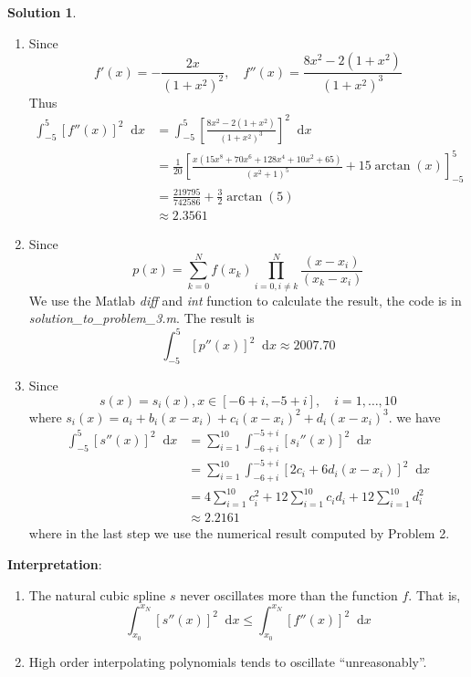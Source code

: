 \documentclass{article}
\newcommand*\diff{\mathop{}\!\mathrm{d}}
\theoremstyle{definition}
\newtheorem{solution}{Solution}
\begin{document}
\begin{solution}
    \begin{enumerate}
    	\item Since 
    	\begin{equation}
    		f'(x)=-\frac{2x}{(1+x^2)^2},\quad  f''(x)=\frac{8x^2-2(1+x^2)}{(1+x^2)^3}
    	\end{equation}
    	Thus
    	\begin{align*}
    	\int_{-5}^{5}\left[f''(x)\right]^2\diff x&=\int_{-5}^{5}\left[\frac{8x^2-2(1+x^2)}{(1+x^2)^3}\right]^2\diff x\\
    	&=\frac{1}{20}\left[\frac{x (15 x^8 + 70 x^6 + 128 x^4 + 10 x^2 + 65)}{(x^2 + 1)^5}+15 \arctan(x)\right]_{-5}^5\\
    	&=\frac{219795}{742586} + \frac32 \arctan(5)\\
    	&\approx 2.3561
    	\end{align*}

    	\item Since 
    	\begin{equation}
    		p(x)=\sum_{k=0}^Nf(x_k)\prod_{i=0,i\neq k}^{N}\frac{(x-x_i)}{(x_k-x_i)}
    	\end{equation}
    	We use the Matlab \emph{diff} and \emph{int} function to calculate the result, the code is in \emph{solution\_to\_problem\_3.m}. The result is
    	\begin{equation}
    		\int_{-5}^{5}\left[p''(x)\right]^2\diff x\approx 2007.70
    	\end{equation}
    	
    	\item Since 
    	\begin{equation}
    		s(x)=s_i(x), x\in[-6+i,-5+i], \quad i=1,\dots,10
    	\end{equation}
    	where $s_i(x)=a_i+b_i(x-x_i)+c_i(x-x_i)^2+d_i(x-x_i)^3$. 
    	we have
    	\begin{align*}
    		\int_{-5}^{5}\left[s''(x)\right]^2\diff x&=\sum_{i=1}^{10}\int_{-6+i}^{-5+i}\left[s_i''(x)\right]^2\diff x\\
    		&=\sum_{i=1}^{10}\int_{-6+i}^{-5+i}\left[2c_i+6d_i(x-x_i)\right]^2\diff x\\
    		&=4\sum_{i=1}^{10}c_i^2+12\sum_{i=1}^{10}c_id_i+12\sum_{i=1}^{10}d_i^2\\
    		&\approx2.2161
    	\end{align*}
    	where in the last step we use the numerical result computed by Problem 2.
    \end{enumerate}
    \textbf{Interpretation}: 
    \begin{enumerate}
    	\item  The natural cubic spline $s$ never oscillates more than the function $f$.  That is,
    	\begin{equation}
    		\int_{x_0}^{x_N}[s''(x)]^2\diff x\leq \int_{x_0}^{x_N}[f''(x)]^2\diff x
    	\end{equation}
    	\item High order interpolating polynomials tends to oscillate ``unreasonably''.

    \end{enumerate}
    

    
\end{solution}
\end{document}
